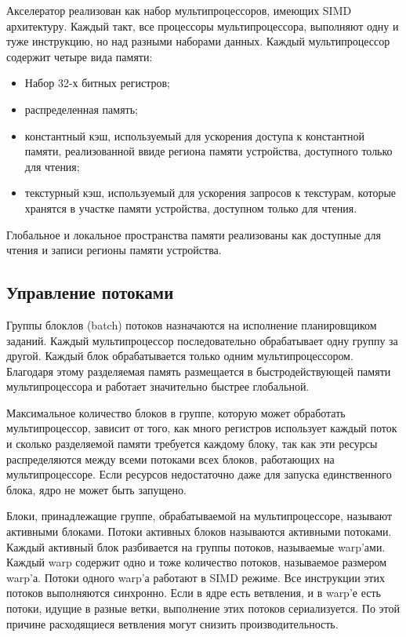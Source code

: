 Акселератор реализован как набор мультипроцессоров, имеющих SIMD архитектуру. Каждый такт, все процессоры мультипроцессора, выполняют одну и туже инструкцию, но над разными наборами данных. Каждый мультипроцессор содержит четыре вида памяти:

\begin{itemize}
\item Набор 32-х битных регистров;

\item распределенная память;

\item константный кэш, используемый для ускорения доступа к константной памяти, реализованной ввиде региона памяти устройства, доступного только для чтения;

\item текстурный кэш, используемый для ускорения запросов к текстурам, которые хранятся в участке памяти устройства, доступном только для чтения.
\end{itemize}

Глобальное и локальное пространства памяти реализованы как доступные для чтения и записи регионы памяти устройства.

\subsection{Управление потоками}

Группы блоклов (batch) потоков назначаются на исполнение планировщиком заданий. Каждый мультипроцессор последовательно обрабатывает одну группу за другой. Каждый блок обрабатывается только одним мультипроцессором. Благодаря этому разделяемая память размещается в быстродействующей памяти мультипроцессора и работает значительно быстрее глобальной.

Максимальное количество блоков в группе, которую может обработать мультипроцессор, зависит от того, как много регистров использует каждый поток и сколько разделяемой памяти требуется каждому блоку, так как эти ресурсы распределяются между всеми потоками всех блоков, работающих на мультипроцессоре. Если ресурсов недостаточно даже для запуска единственного блока, ядро не может быть запущено.

Блоки, принадлежащие группе, обрабатываемой на мультипроцессоре, называют активными блоками. Потоки активных блоков называются активными потоками. Каждый активный блок разбивается на группы потоков, называемые warp'ами. Каждый warp содержит одно и тоже количество потоков, называемое размером warp'а. Потоки одного warp'а работают в SIMD режиме. Все инструкции этих потоков выполняются синхронно. Если в ядре есть ветвления, и в warp'е есть потоки, идущие в разные ветки, выполнение этих потоков сериализуется. По этой причине расходящиеся ветвления могут снизить производительность.

